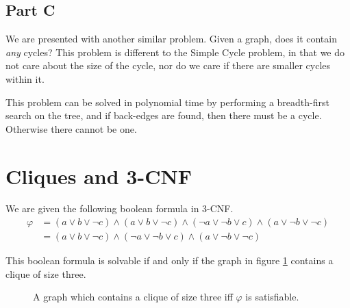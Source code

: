 \documentclass{article}
\begin{document}
\subsection*{Part C}

We are presented with another similar problem. Given a graph, does it contain \emph{any} cycles? This problem is different to the Simple Cycle problem, in that we do not care about the size of the cycle, nor do we care if there are smaller cycles within it.

This problem can be solved in polynomial time by performing a breadth-first search on the tree, and if back-edges are found, then there must be a cycle. Otherwise there cannot be one.

\section{Cliques and 3-CNF}

We are given the following boolean formula in 3-CNF.
\begin{align*}
	\varphi & = (a \lor b \lor \lnot c) \land (a \lor b \lor \lnot c) \land (\lnot a \lor \lnot b \lor c) \land (a \lor \lnot b \lor \lnot c) \\
	        & = (a \lor b \lor \lnot c) \land (\lnot a \lor \lnot b \lor c) \land (a \lor \lnot b \lor \lnot c)
\end{align*}

This boolean formula is solvable if and only if the graph in figure \ref{q3-clique} contains a clique of size three.

\begin{figure}[htbp]
	\centering
	\caption{A graph which contains a clique of size three iff \(\varphi\) is satisfiable.}
	\label{q3-clique}
\end{figure}
\end{document}
